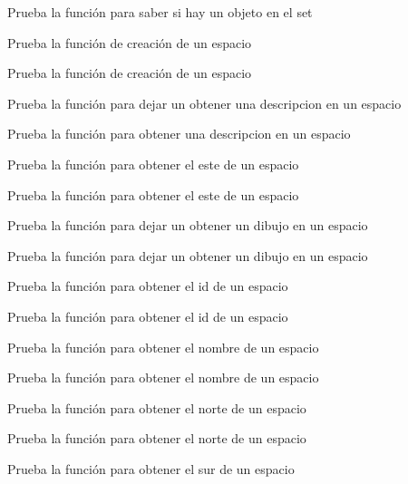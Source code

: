 \begin{DoxyRefList}
Prueba la función para saber si hay un objeto en el set  
\item[\label{test__test000241}%
\Hypertarget{test__test000241}%
Member \hyperlink{space__test_8h_a69278cc022dc5688d4725f8d36317b30}{test1\+\_\+space\+\_\+create} ()]Prueba la función de creación de un espacio 

Prueba la función de creación de un espacio  
\item[\label{test__test000276}%
\Hypertarget{test__test000276}%
Member \hyperlink{space__test_8h_a9a9da97ed6f49f2ae325177caecfea9c}{test1\+\_\+space\+\_\+get\+\_\+description} ()]Prueba la función para dejar un obtener una descripcion en un espacio 

Prueba la función para obtener una descripcion en un espacio  
\item[\label{test__test000262}%
\Hypertarget{test__test000262}%
Member \hyperlink{space__test_8h_a354adb2722b06ec65b7212d2736d6417}{test1\+\_\+space\+\_\+get\+\_\+east} ()]Prueba la función para obtener el este de un espacio 

Prueba la función para obtener el este de un espacio  
\item[\label{test__test000272}%
\Hypertarget{test__test000272}%
Member \hyperlink{space__test_8h_a3b6d16613ee2f3940fe7c92f3934508a}{test1\+\_\+space\+\_\+get\+\_\+gdesc} ()]Prueba la función para dejar un obtener un dibujo en un espacio 

Prueba la función para dejar un obtener un dibujo en un espacio  
\item[\label{test__test000266}%
\Hypertarget{test__test000266}%
Member \hyperlink{space__test_8h_a920df9e02482f4f1e6a5ebcaec523860}{test1\+\_\+space\+\_\+get\+\_\+id} ()]Prueba la función para obtener el id de un espacio 

Prueba la función para obtener el id de un espacio  
\item[\label{test__test000253}%
\Hypertarget{test__test000253}%
Member \hyperlink{space__test_8h_ad12c42523c517507566c5c68b1527689}{test1\+\_\+space\+\_\+get\+\_\+name} ()]Prueba la función para obtener el nombre de un espacio 

Prueba la función para obtener el nombre de un espacio  
\item[\label{test__test000258}%
\Hypertarget{test__test000258}%
Member \hyperlink{space__test_8h_a3a87f1e1e173d622bfbd3bcd14e060ca}{test1\+\_\+space\+\_\+get\+\_\+north} ()]Prueba la función para obtener el norte de un espacio 

Prueba la función para obtener el norte de un espacio  
\item[\label{test__test000260}%
\Hypertarget{test__test000260}%
Member \hyperlink{space__test_8h_a8e345065f58565e131bdb3a9d0096ed5}{test1\+\_\+space\+\_\+get\+\_\+south} ()]Prueba la función para obtener el sur de un espacio 


\end{DoxyRefList}
